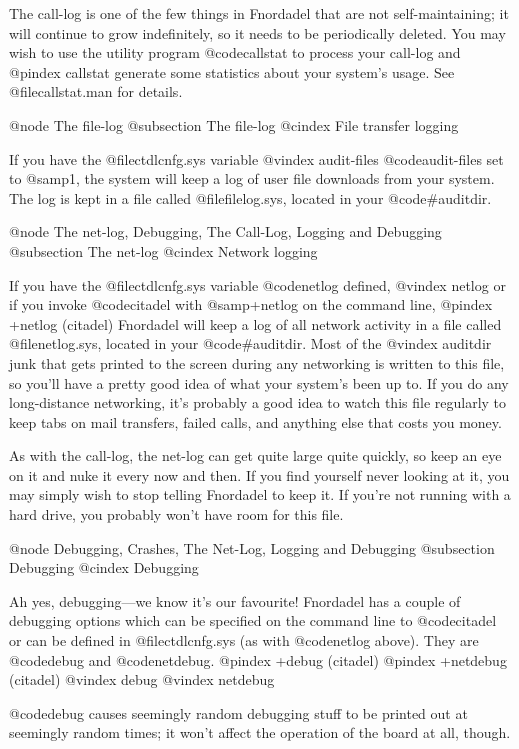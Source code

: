The call-log is one of the few things in Fnordadel that
are not self-maintaining; it will continue to grow indefinitely,
so it needs to be periodically deleted.  You may wish to use the
utility program @code{callstat} to process your call-log and
@pindex callstat
generate some statistics about your system's usage.  See
@file{callstat.man} for details.

@node The file-log
@subsection The file-log
@cindex File transfer logging

If you have the @file{ctdlcnfg.sys} variable
@vindex audit-files
@code{audit-files} set
to @samp{1}, the system will keep a log of user file downloads
from your system.  The log is kept in a file called @file{filelog.sys},
located in your @code{#auditdir}.

@node The net-log, Debugging, The Call-Log, Logging and Debugging
@subsection The net-log
@cindex Network logging

If you have the @file{ctdlcnfg.sys} variable @code{netlog} defined,
@vindex netlog
or if you invoke @code{citadel} with @samp{+netlog} on the command line,
@pindex +netlog (citadel)
Fnordadel will keep a log of all network activity in a file
called @file{netlog.sys}, located in your @code{#auditdir}.  Most of the
@vindex auditdir
junk that gets printed to the screen during any networking is
written to this file, so you'll have a pretty good idea of what
your system's been up to.  If you do any long-distance networking,
it's probably a good idea to watch this file regularly to keep
tabs on mail transfers, failed calls, and anything else that
costs you money.

As with the call-log, the net-log can get quite large
quite quickly, so keep an eye on it and nuke it every now and
then.  If you find yourself never looking at it, you may simply
wish to stop telling Fnordadel to keep it.  If you're not
running with a hard drive, you probably won't have room for
this file.

@node Debugging, Crashes, The Net-Log, Logging and Debugging
@subsection Debugging
@cindex Debugging

Ah yes, debugging---we know it's our favourite!
Fnordadel has a couple of debugging options which can be
specified on the command line to @code{citadel} or can be defined
in @file{ctdlcnfg.sys} (as with @code{netlog} above).  They are @code{debug}
and @code{netdebug}.
@pindex +debug (citadel)
@pindex +netdebug (citadel)
@vindex debug
@vindex netdebug

@code{debug} causes seemingly random debugging stuff to be
printed out at seemingly random times; it won't affect the
operation of the board at all, though.

